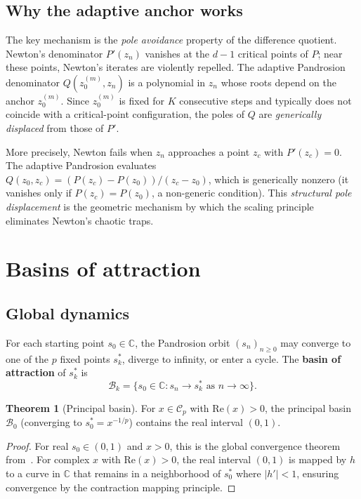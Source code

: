 \documentclass[11pt,a4paper]{article}
\theoremstyle{definition}
\newtheorem{theorem}{Theorem}[section]
\newcommand{\CC}{\mathbb{C}}
\begin{document}
\subsection{Why the adaptive anchor works}

The key mechanism is the \emph{pole avoidance} property of the difference quotient.  Newton's denominator $P'(z_n)$ vanishes at the $d-1$ critical points of $P$; near these points, Newton's iterates are violently repelled.  The adaptive Pandrosion denominator $Q(z_0^{(m)}, z_n)$ is a polynomial in $z_n$ whose roots depend on the anchor $z_0^{(m)}$.  Since $z_0^{(m)}$ is fixed for $K$ consecutive steps and typically does not coincide with a critical-point configuration, the poles of $Q$ are \emph{generically displaced} from those of $P'$.

More precisely, Newton fails when $z_n$ approaches a point $z_c$ with $P'(z_c) = 0$.  The adaptive Pandrosion evaluates $Q(z_0, z_c) = (P(z_c) - P(z_0))/(z_c - z_0)$, which is generically nonzero (it vanishes only if $P(z_c) = P(z_0)$, a non-generic condition).  This \emph{structural pole displacement} is the geometric mechanism by which the scaling principle eliminates Newton's chaotic traps.

\section{Basins of attraction}
\label{sec:basins}

\subsection{Global dynamics}

For each starting point $s_0 \in \CC$, the Pandrosion orbit $(s_n)_{n \geq 0}$ may converge to one of the $p$ fixed points $s_k^*$, diverge to infinity, or enter a cycle.  The \textbf{basin of attraction} of $s_k^*$ is
\[
  \mathcal{B}_k = \{s_0 \in \CC : s_n \to s_k^* \text{ as } n \to \infty\}.
\]

\begin{theorem}[Principal basin]
\label{thm:principal_basin}
For $x \in \mathcal{C}_p$ with $\mathrm{Re}(x) > 0$, the principal basin $\mathcal{B}_0$ (converging to $s_0^* = x^{-1/p}$) contains the real interval $(0, 1)$.
\end{theorem}

\begin{proof}
For real $s_0 \in (0,1)$ and $x > 0$, this is the global convergence theorem from~\cite{besevic2026}.  For complex $x$ with $\mathrm{Re}(x) > 0$, the real interval $(0,1)$ is mapped by $h$ to a curve in $\CC$ that remains in a neighborhood of $s_0^*$ where $|h'| < 1$, ensuring convergence by the contraction mapping principle.
\end{proof}
\end{document}

